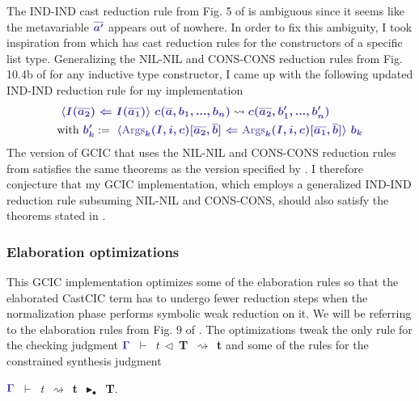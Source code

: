 \documentclass{article}
\theoremstyle{definition}
\newcommand{\Gcode}[1]{{\color{OliveGreen}\textit{#1}}}
\newcommand{\Ccode}[1]{{\color{BlueViolet}\textbf{#1}}}
\newcommand{\Ccmath}[1]{{\color{BlueViolet}\boldsymbol{#1}}}
\newcommand{\ElabCheck}[4]{#1~\(\vdash\)~#2~\(\triangleleft\)~#3~\(\rightsquigarrow\)~#4}
\newcommand{\ElabConstrSynth}[5]{
  #1~\(\vdash\)~#2~\(\rightsquigarrow\)~#3~\(\blacktriangleright_{#4}\)~#5}
\newcommand{\Cast}[3]{
  \(\Ccmath{\langle}\)#1~\(\Ccmath{\Leftarrow}\)~#2\(\Ccmath{\rangle}\)~#3}
\begin{document}
The IND-IND cast reduction rule from Fig. 5 of
\citet{lennon-bertrand_gradualizing_2022} is ambiguous since it seems like the
metavariable \(\Ccmath{\overline{a'}}\) appears out of nowhere. In order to fix
this ambiguity, I took inspiration from
\citet{lennon-bertrand_bidirectional_2022} which has cast reduction rules for
the constructors of a specific list type. Generalizing the NIL-NIL and CONS-CONS
reduction rules from Fig. 10.4b of \citet{lennon-bertrand_bidirectional_2022}
for any inductive type constructor, I came up with the following updated IND-IND
reduction rule for my implementation
\[
\begin{aligned}
  &\text{\Cast{\(\Ccmath{I(\overline{a_2})}\)}
              {\(\Ccmath{I(\overline{a_1})}\)}
              {\(\Ccmath{c(\overline{a}, b_1, ..., b_n)}\)}}
  \rightsquigarrow \Ccmath{c(\overline{a_2}, b'_1, ..., b'_n)}\\
  &\text{with }
    \Ccmath{b_k'} := \text{\Cast{\(\Ccmath{\text{Args}_k(I,i,c)[\overline{a_2},\overline{b}]}\)}
                                {\(\Ccmath{\text{Args}_k(I,i,c)[\overline{a_1},\overline{b}]}\)}
                                {\(\Ccmath{b_k}\)}}
\end{aligned}
\]
The version of GCIC that uses the NIL-NIL and CONS-CONS reduction rules from
\citet{lennon-bertrand_bidirectional_2022} satisfies the same theorems as the
version specified by \citet{lennon-bertrand_gradualizing_2022}. I therefore
conjecture that my GCIC implementation, which employs a generalized IND-IND
reduction rule subsuming NIL-NIL and CONS-CONS, should also satisfy the theorems
stated in \citet{lennon-bertrand_gradualizing_2022}.

\subsubsection{Elaboration optimizations}\label{sec:elab-optimize}

This GCIC implementation optimizes some of the elaboration rules so that the
elaborated CastCIC term has to undergo fewer reduction steps when the
normalization phase performs symbolic weak reduction on it. We will be referring
to the elaboration rules from Fig. 9 of
\citet{lennon-bertrand_gradualizing_2022}. The optimizations tweak the only rule
for the checking judgment
\ElabCheck{\(\Ccmath{\Gamma}\)}{\Gcode{t}}{\Ccode{T}}{\Ccode{t}} and some of the
rules for the constrained synthesis judgment
\ElabConstrSynth{\(\Ccmath{\Gamma}\)}{\Gcode{t}}{\Ccode{t}}{\bullet}{\Ccode{T}}.
\end{document}
